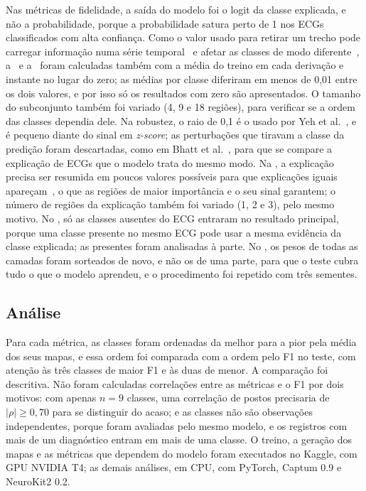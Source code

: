 Nas métricas de fidelidade, a saída do modelo foi o logit da classe explicada, e não a probabilidade, porque a probabilidade satura perto de 1 nos ECGs classificados com alta confiança. Como o valor usado para retirar um trecho pode carregar informação numa série temporal~\cite{hollig2023} e afetar as classes de modo diferente~\cite{baer2025a}, a \FC\ e a \FE\ foram calculadas também com a média do treino em cada derivação e instante no lugar do zero; as médias por classe diferiram em menos de 0,01 entre os dois valores, e por isso só os resultados com zero são apresentados. O tamanho do subconjunto também foi variado (4, 9 e 18 regiões), para verificar se a ordem das classes dependia dele. Na robustez, o raio de 0,1 é o usado por Yeh et al.~\cite{yeh2019}, e é pequeno diante do sinal em \textit{z-score}; as perturbações que tiravam a classe da predição foram descartadas, como em Bhatt et al.~\cite{bhatt2020}, para que se compare a explicação de ECGs que o modelo trata do mesmo modo. Na \CS, a explicação precisa ser resumida em poucos valores possíveis para que explicações iguais apareçam~\cite{dasgupta2022}, o que as regiões de maior importância e o seu sinal garantem; o número de regiões da explicação também foi variado (1, 2 e 3), pelo mesmo motivo. No \RL, só as classes ausentes do ECG entraram no resultado principal, porque uma classe presente no mesmo ECG pode usar a mesma evidência da classe explicada; as presentes foram analisadas à parte. No \EM, os pesos de todas as camadas foram sorteados de novo, e não os de uma parte, para que o teste cubra tudo o que o modelo aprendeu, e o procedimento foi repetido com três sementes.

\subsection{Análise}\label{sec:analise}
Para cada métrica, as classes foram ordenadas da melhor para a pior pela média dos seus mapas, e essa ordem foi comparada com a ordem pelo F1 no teste, com atenção às três classes de maior F1 e às duas de menor. A comparação foi descritiva. Não foram calculadas correlações entre as métricas e o F1 por dois motivos: com apenas $n = 9$ classes, uma correlação de postos precisaria de $|\rho| \ge 0{,}70$ para se distinguir do acaso; e as classes não são observações independentes, porque foram avaliadas pelo mesmo modelo, e os registros com mais de um diagnóstico entram em mais de uma classe. O treino, a geração dos mapas e as métricas que dependem do modelo foram executados no Kaggle, com GPU NVIDIA T4; as demais análises, em CPU, com PyTorch, Captum 0.9 e NeuroKit2 0.2.
